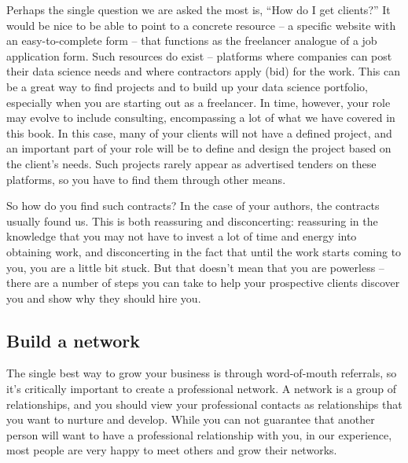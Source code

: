 \documentclass[
]{book}
\begin{document}
Perhaps the single question we are asked the most is, ``How do I get
clients?'' It would be nice to be able to point to a concrete resource
-- a specific website with an easy-to-complete form -- that functions as
the freelancer analogue of a job application form. Such resources do
exist -- platforms where companies can post their data science needs and
where contractors apply (bid) for the work. This can be a great way to
find projects and to build up your data science portfolio, especially
when you are starting out as a freelancer. In time, however, your role
may evolve to include consulting, encompassing a lot of what we have
covered in this book. In this case, many of your clients will not have a
defined project, and an important part of your role will be to define
and design the project based on the client's needs. Such projects rarely
appear as advertised tenders on these platforms, so you have to find
them through other means.

So how do you find such contracts? In the case of your authors, the
contracts usually found us. This is both reassuring and disconcerting:
reassuring in the knowledge that you may not have to invest a lot of
time and energy into obtaining work, and disconcerting in the fact that
until the work starts coming to you, you are a little bit stuck. But
that doesn't mean that you are powerless -- there are a number of steps
you can take to help your prospective clients discover you and show why
they should hire you.

\hypertarget{build-a-network}{%
\subsection{Build a network}\label{build-a-network}}

The single best way to grow your business is through word-of-mouth
referrals, so it's critically important to create a professional
network. A network is a group of relationships, and you should view your
professional contacts as relationships that you want to nurture and
develop. While you can not guarantee that another person will want to
have a professional relationship with you, in our experience, most
people are very happy to meet others and grow their networks.
\end{document}
